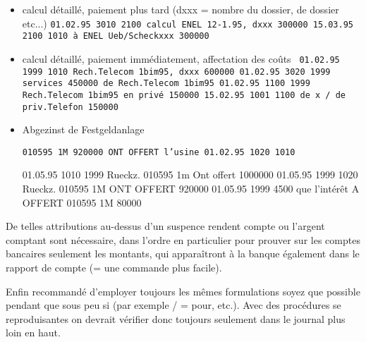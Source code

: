 \documentclass[12pt]{report}
\begin{document}
\begin{appendix}
\begin{itemize}
\item calcul détaillé, paiement plus tard (dxxx = nombre du dossier, de dossier etc...)
{\tt  01.02.95 3010 2100 calcul ENEL 12-1.95, dxxx 300000 15.03.95 2100 1010 à ENEL Ueb/Scheckxxx 300000 }



\item calcul détaillé, paiement immédiatement, affectation des coûts  {\tt 
01.02.95 1999 1010 Rech.Telecom 1bim95, dxxx 600000 01.02.95 3020 1999 services 450000 de Rech.Telecom 1bim95 01.02.95 1100 1999 Rech.Telecom 1bim95 en privé 150000 15.02.95 1001 1100 de x / de priv.Telefon 150000 }



\item Abgezinst de Festgeldanlage  {\tt  010595 1M 920000 ONT OFFERT l'usine 01.02.95 1020 1010

01.05.95 1010 1999 Rueckz.  010595 1m Ont offert 1000000 01.05.95 1999 1020 Rueckz.  010595 1M ONT OFFERT 920000 01.05.95 1999 4500 que l'intérêt A OFFERT 010595 1M 80000 }



\end{itemize}


 De telles attributions au-dessus d'un suspence rendent compte ou l'argent
 comptant sont nécessaire, dans l'ordre en particulier pour prouver sur les
 comptes bancaires seulement les montants, qui apparaîtront à la banque
 également dans le rapport de compte (= une commande plus facile).

 Enfin recommandé d'employer toujours les mêmes formulations soyez que possible
 pendant que sous peu si (par exemple / = pour, etc.).  Avec des procédures se
 reproduisantes on devrait vérifier donc toujours seulement dans le journal
 plus loin en haut.

\end{appendix}
\end{document}
